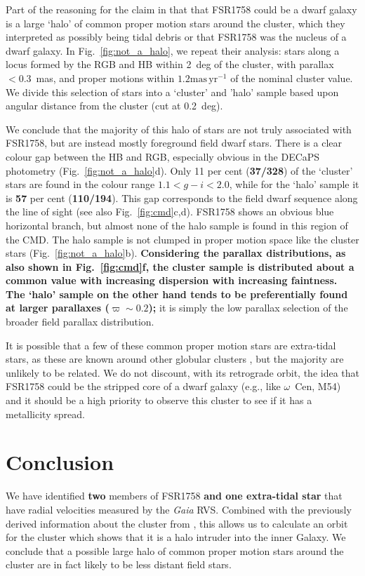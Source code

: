 \documentclass[fleqn,usenatbib]{mnras}
\newcommand{\masyr}{\ensuremath{\textrm{mas}\,\textrm{yr}^{-1}}}
\begin{document}
Part of the reasoning for the claim in  that that FSR1758 could be a dwarf galaxy is a large `halo' of common proper motion stars around the cluster, which they interpreted as possibly being tidal debris or that FSR1758 was the nucleus of a dwarf galaxy. In Fig.\ \ref{fig:not_a_halo}, we repeat their analysis: stars along a locus formed by the RGB and HB within 2~deg of the cluster, with parallax $<0.3$~mas, and proper motions within $1.2\masyr$ of the nominal cluster value. We divide this selection of stars into a `cluster' and 'halo' sample based upon angular distance from the cluster (cut at 0.2~deg).

We conclude that the majority of this halo of stars are not truly associated with FSR1758, but are instead mostly foreground field dwarf stars. There is a clear colour gap between the HB and RGB, especially obvious in the DECaPS photometry (Fig.\ \ref{fig:not_a_halo}d). Only 11 per cent (\textbf{37/328}) of the `cluster' stars are found in the colour range $1.1<g-i<2.0$,  while for the `halo' sample it is \textbf{57} per cent (\textbf{110/194}). This gap corresponds to the field dwarf sequence along the line of sight (see also Fig.\ \ref{fig:cmd}c,d). FSR1758 shows an obvious blue horizontal branch, but almost none of the halo sample is found in this region of the CMD. The halo sample is not clumped in proper motion space like the cluster stars (Fig.\ \ref{fig:not_a_halo}b). \textbf{Considering the parallax distributions, as also shown in Fig.\ \ref{fig:cmd}f, the cluster sample is distributed about a common value with increasing dispersion with increasing faintness. The `halo' sample on the other hand tends to be preferentially found at larger parallaxes ($\varpi\sim0.2$);} it is simply the low parallax selection of the broader field parallax distribution.

It is possible that a few of these common proper motion stars are extra-tidal stars, as these are known around other globular clusters \citep[e.g.,][]{Simpson:2017be}, but the majority are unlikely to be related. We do not discount, with its retrograde orbit, the idea that FSR1758 could be the stripped core of a dwarf galaxy (e.g., like $\omega$~Cen, M54) and it should be a high priority to observe this cluster to see if it has a metallicity spread.

\section{Conclusion}
We have identified \textbf{two} members of FSR1758 \textbf{and one extra-tidal star} that have radial velocities measured by the \textit{Gaia} RVS. Combined with the previously derived information about the cluster from , this allows us to calculate an orbit for the cluster which shows that it is a halo intruder into the inner Galaxy. We conclude that a possible large halo of common proper motion stars around the cluster are in fact likely to be less distant field stars. 
\end{document}
